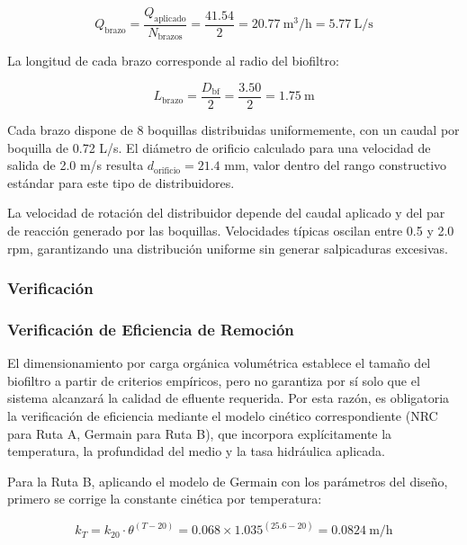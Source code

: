 \documentclass[12pt,a4paper]{article}
\begin{document}
\begin{equation}
Q_{\text{brazo}} = \frac{Q_{\text{aplicado}}}{N_{\text{brazos}}} = \frac{41.54}{2} = 20.77\ \text{m}^3\text{/h} = 5.77\ \text{L/s}
\end{equation}

La longitud de cada brazo corresponde al radio del biofiltro:

\begin{equation}
L_{\text{brazo}} = \frac{D_{\text{bf}}}{2} = \frac{3.50}{2} = 1.75\ \text{m}
\end{equation}

Cada brazo dispone de 8 boquillas distribuidas uniformemente, con un caudal por boquilla de 0.72 L/s. El diámetro de orificio calculado para una velocidad de salida de 2.0 m/s resulta $d_{\text{orificio}} = 21.4$ mm, valor dentro del rango constructivo estándar para este tipo de distribuidores.

La velocidad de rotación del distribuidor depende del caudal aplicado y del par de reacción generado por las boquillas. Velocidades típicas oscilan entre 0.5 y 2.0 rpm, garantizando una distribución uniforme sin generar salpicaduras excesivas.

\subsubsection{Verificación}

\subsubsection*{Verificación de Eficiencia de Remoción}

El dimensionamiento por carga orgánica volumétrica establece el tamaño del biofiltro a partir de criterios empíricos, pero no garantiza por sí solo que el sistema alcanzará la calidad de efluente requerida. Por esta razón, es obligatoria la verificación de eficiencia mediante el modelo cinético correspondiente (NRC para Ruta A, Germain para Ruta B), que incorpora explícitamente la temperatura, la profundidad del medio y la tasa hidráulica aplicada.

Para la Ruta B, aplicando el modelo de Germain con los parámetros del diseño, primero se corrige la constante cinética por temperatura:

\begin{equation}
k_T = k_{20} \cdot \theta^{(T-20)} = 0.068 \times 1.035^{(25.6-20)} = 0.0824\ \text{m/h}
\end{equation}
\end{document}
